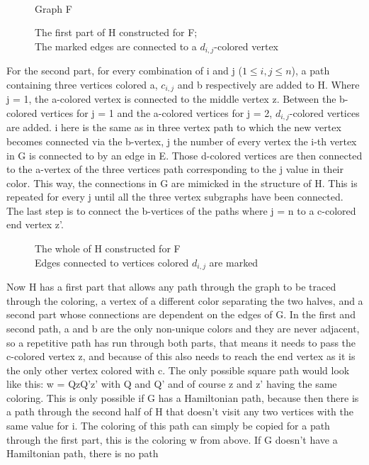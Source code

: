 \documentclass[12pt,a4paper]{article}
\begin{document}
\begin{figure}[h]
\begin{minipage}{0.2\linewidth}
	
	\caption{\\Graph F}
\end{minipage}
\begin{minipage}{0.8\linewidth}
	
	\caption{The first part of H constructed for F; \\The marked edges are connected to a $d_{i,j}$-colored vertex}
\end{minipage}
\end{figure}
\newline
 For the second part, for every combination of i and j ($1 \leq i, j \leq n$), a path containing three vertices colored a, $c_{i,j}$ and b respectively are added to H. Where j = 1, the a-colored vertex is connected to the middle vertex z. Between the b-colored vertices for j = 1 and the a-colored vertices for j = 2, $d_{i,j}$-colored vertices are added. i here is the same as in three vertex path to which the new vertex becomes connected via the b-vertex, j the number of every vertex the i-th vertex in G is connected to by an edge in E. Those d-colored vertices are then connected to the a-vertex of the three vertices path corresponding to the j value in their color. This way, the connections in G are mimicked in the structure of H. This is repeated for every j until all the three vertex subgraphs have been connected. The last step is to connect the b-vertices of the paths where j = n to a c-colored end vertex z'. 
\begin{figure}[h]
	
	\caption{The whole of H constructed for F \\ Edges connected to vertices colored $d_{i,j}$ are marked}
\end{figure}
\newpage
Now H has a first part that allows any path through the graph to be traced through the coloring, a vertex of a different color separating the two halves, and a second part whose connections are dependent on the edges of G. In the first and second path, a and b are the only non-unique colors and they are never adjacent, so a repetitive path has run through both parts, that means it needs to pass the c-colored vertex z, and because of this also needs to reach the end vertex as it is the only other vertex colored with c. The only possible square path would look like this: w = QzQ'z' with Q and Q' and of course z and z' having the same coloring. This is only possible if G has a Hamiltonian path, because then there is a path through the second half of H that doesn't visit any two vertices with the same value for i. The coloring of this path can simply be copied for a path through the first part, this is the coloring w from above. If G doesn't have a Hamiltonian path, there is no path 
\end{document}
